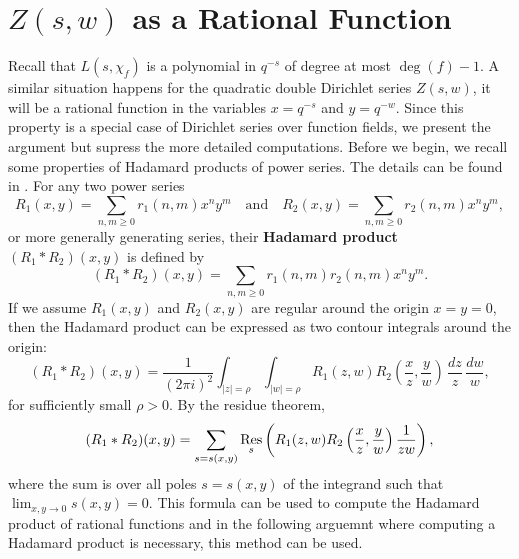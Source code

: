 \documentclass[12pt,reqno,oneside]{amsart}
\begin{document}
\section*{\texorpdfstring{$Z(s,w)$}{Z(s,w)} as a Rational Function}
    Recall that $L(s,\chi_{f})$ is a polynomial in $q^{-s}$ of degree at most $\deg(f)-1$. A similar situation happens for the quadratic double Dirichlet series $Z(s,w)$, it will be a rational function in the variables $x = q^{-s}$ and $y = q^{-w}$. Since this property is a special case of Dirichlet series over function fields, we present the argument but supress the more detailed computations. Before we begin, we recall some properties of Hadamard products of power series. The details can be found in \cite{S}. For any two power series
    \[
        R_{1}(x,y) = \sum_{n,m \ge 0}r_{1}(n,m)x^{n}y^{m} \quad \text{and} \quad R_{2}(x,y) = \sum_{n,m \ge 0}r_{2}(n,m)x^{n}y^{m},
    \]
    or more generally generating series, their \textbf{Hadamard product} $(R_{1} \ast R_{2})(x,y)$ is defined by
    \[
        (R_{1} \ast R_{2})(x,y) = \sum_{n,m \ge 0}r_{1}(n,m)r_{2}(n,m)x^{n}y^{m}.
    \]
    If we assume $R_{1}(x,y)$ and $R_{2}(x,y)$ are regular around the origin $x = y = 0$, then the Hadamard product can be expressed as two contour integrals around the origin:
    \[
        (R_{1} \ast R_{2})(x,y) = \frac{1}{(2\pi i)^{2}}\int_{|z| = \rho}\int_{|w| = \rho}R_{1}(z,w)R_{2}\left(\frac{x}{z},\frac{y}{w}\right)\,\frac{dz}{z}\,\frac{dw}{w},
    \]
    for sufficiently small $\rho > 0$. By the residue theorem,
    \[
        (R_{1} \ast R_{2})(x,y) = \sum_{s = s(x,y)}\operatorname*{\mathrm{Res}}_{s}\left(R_{1}(z,w)R_{2}\left(\frac{x}{z},\frac{y}{w}\right)\frac{1}{zw}\right),
    \]
    where the sum is over all poles $s = s(x,y)$ of the integrand such that $\lim_{x,y \to 0}s(x,y) = 0$. This formula can be used to compute the Hadamard product of rational functions and in the following arguemnt where computing a Hadamard product is necessary, this method can be used.
\end{document}
